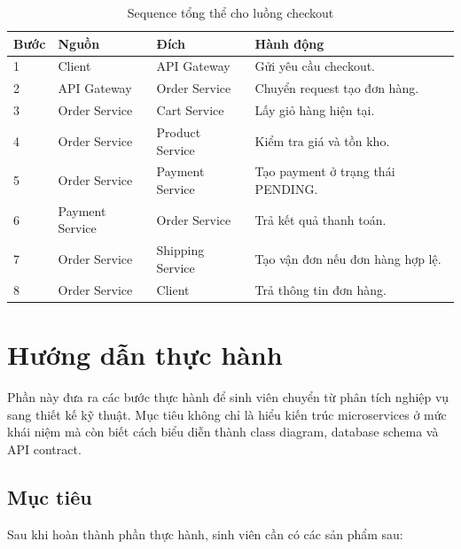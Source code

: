 \documentclass[../main.tex]{subfiles}
\begin{document}
\begin{table}[H]
    \centering
    \caption{Sequence tổng thể cho luồng checkout}
    \label{tab:chapter2-checkout-sequence}
    \begin{tabular}{|p{}|p{}|p{}|p{}|}
        \hline
        \rowcolor{primary!35}
        \textbf{Bước} & \textbf{Nguồn} & \textbf{Đích} & \textbf{Hành động} \\
        \hline
        1 & Client & API Gateway & Gửi yêu cầu checkout. \\
        \hline
        2 & API Gateway & Order Service & Chuyển request tạo đơn hàng. \\
        \hline
        3 & Order Service & Cart Service & Lấy giỏ hàng hiện tại. \\
        \hline
        4 & Order Service & Product Service & Kiểm tra giá và tồn kho. \\
        \hline
        5 & Order Service & Payment Service & Tạo payment ở trạng thái PENDING. \\
        \hline
        6 & Payment Service & Order Service & Trả kết quả thanh toán. \\
        \hline
        7 & Order Service & Shipping Service & Tạo vận đơn nếu đơn hàng hợp lệ. \\
        \hline
        8 & Order Service & Client & Trả thông tin đơn hàng. \\
        \hline
    \end{tabular}
\end{table}

\section{Hướng dẫn thực hành}
\label{section:2.10}

Phần này đưa ra các bước thực hành để sinh viên chuyển từ phân tích nghiệp vụ sang thiết kế kỹ thuật. Mục tiêu không chỉ là hiểu kiến trúc microservices ở mức khái niệm mà còn biết cách biểu diễn thành class diagram, database schema và API contract.

\subsection{Mục tiêu}
\label{subsection:2.10.1}

Sau khi hoàn thành phần thực hành, sinh viên cần có các sản phẩm sau:
\end{document}
